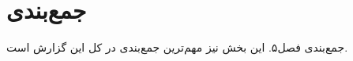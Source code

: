 \section{جمع‌بندی}
\label{ch5.X}

جمع‌بندی فصل۵. این بخش نیز مهم‌ترین جمع‌بندی در کل این گزارش است.
